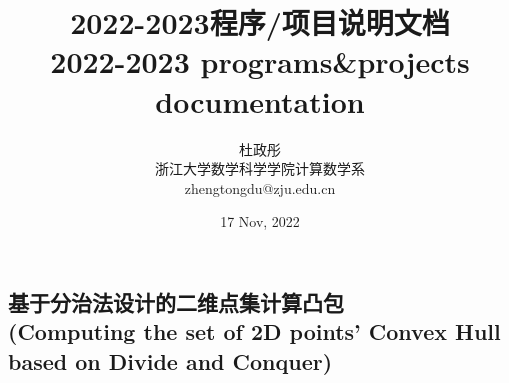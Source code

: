 \documentclass[a4paper,oneside]{report}
\begin{document}
\begin{CJK*}{UTF8}{gkai}
\CJKindent
\makeatletter %
\def\@cite#1#2{\textsuperscript{[{#1\if@tempswa , #2\fi}]}}
\makeatother
\newtheorem{theorem}{{定理}}
\newtheorem{remark}{{注}}
\newtheorem{proposition}[theorem]{{命题}}
\newtheorem{lemma}[theorem]{{引理}}
\newtheorem{corollary}[theorem]{{推论}}
\newtheorem{definition}[theorem]{{定义}}
\newtheorem{question}[theorem]{{问题}}

\renewcommand{\bibname}{\centerline{参考文献}}
\renewcommand{\tablename}{表}
\renewcommand{\figurename}{图}


\title{2022-2023程序/项目说明文档 \\ 2022-2023 programs\&projects documentation}
\author{杜政彤 \\ 浙江大学数学科学学院计算数学系 \\ zhengtongdu@zju.edu.cn}
\date{17 Nov, 2022}

\maketitle



\pagestyle{empty}

\tableofcontents
\clearpage

\pagestyle{fancy}
\fancyhead{}

\chead{}

\chapter{基于分治法设计的二维点集计算凸包 \\(Computing the set of 2D points' Convex Hull based on Divide and Conquer)}\label{sec:convexHull}


\end{CJK*}
\end{document}
